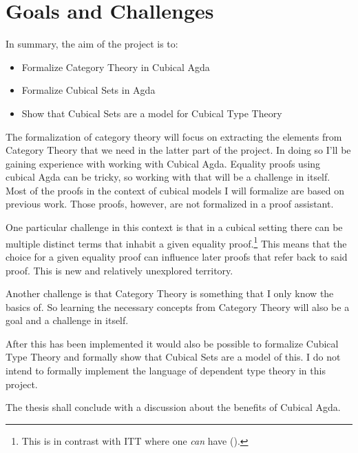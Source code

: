 \documentclass{article}
\begin{document}
\section{Goals and Challenges}
%
In summary, the aim of the project is to:
%
\begin{itemize}
\item
Formalize Category Theory in Cubical Agda
\item
Formalize Cubical Sets in Agda
\item
Show that Cubical Sets are a model for Cubical Type Theory
\end{itemize}
%
The formalization of category theory will focus on extracting the elements from
Category Theory that we need in the latter part of the project. In doing so I'll
be gaining experience with working with Cubical Agda. Equality proofs using
cubical Agda can be tricky, so working with that will be a challenge in itself.
Most of the proofs in the context of cubical models I will formalize are based
on previous work. Those proofs, however, are not formalized in a proof
assistant.

One particular challenge in this context is that in a cubical setting there can
be multiple distinct terms that inhabit a given equality proof.\footnote{This is
in contrast with ITT where one \emph{can} have 
(\cite[p. 4]{huber-2016}).} This means that the choice for a given equality
proof can influence later proofs that refer back to said proof. This is new and
relatively unexplored territory.

Another challenge is that Category Theory is something that I only know the
basics of. So learning the necessary concepts from Category Theory will also be
a goal and a challenge in itself.

After this has been implemented it would also be possible to formalize Cubical
Type Theory and formally show that Cubical Sets are a model of this. I do not
intend to formally implement the language of dependent type theory in this
project.

The thesis shall conclude with a discussion about the benefits of Cubical Agda.
%

\nocite{cubical-demo}
\nocite{coquand-2013}

\begin{appendices}

\end{appendices}
\end{document}
